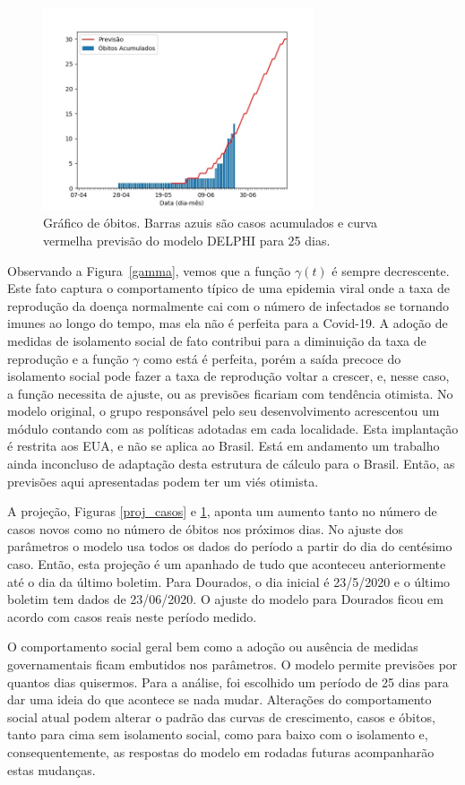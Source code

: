 \documentclass[12pt]{article}
\begin{document}
\begin{figure}[t]
 \centering
 \includegraphics[width=8cm]{figs/Fig_Brasil_MS_Dourados_obitos_20200624_025dias.jpg}
 \caption{Gráfico de óbitos. Barras azuis são casos acumulados e curva vermelha previsão do modelo DELPHI para 25 dias.}
 \label{proj_obitos}
\end{figure}

Observando a Figura~\ref{gamma}, vemos que a função $\gamma(t)$ é sempre decrescente. Este fato captura o comportamento típico de uma epidemia viral onde a taxa de reprodução da doença normalmente cai com o número de infectados se tornando imunes ao longo do tempo, mas ela não é perfeita para a Covid-19. A adoção de medidas de isolamento social de fato contribui para a diminuição da taxa de reprodução e a função $\gamma$ como está é perfeita, porém a saída precoce do isolamento social pode fazer a taxa de reprodução voltar a crescer, e, nesse caso, a função necessita de ajuste, ou as previsões ficariam com tendência otimista. No modelo original, o grupo responsável pelo seu desenvolvimento acrescentou um módulo contando com as políticas adotadas em cada localidade. Esta implantação é restrita aos EUA, e não se aplica ao Brasil. Está em andamento um trabalho ainda inconcluso de adaptação desta estrutura de cálculo para o Brasil. Então, as previsões aqui apresentadas podem ter um viés otimista. 

A projeção, Figuras \ref{proj_casos} e \ref{proj_obitos}, aponta um aumento tanto no número de casos novos como no número de óbitos nos próximos dias. No ajuste dos parâmetros o modelo usa todos os dados do período a partir do dia do centésimo caso. Então, esta projeção é um apanhado de tudo que aconteceu anteriormente até o dia da último boletim. Para Dourados, o dia inicial é 23/5/2020 e o último boletim tem dados de 23/06/2020. O ajuste do modelo para Dourados ficou em acordo com casos reais neste período medido.

O comportamento social geral bem como a adoção ou ausência de medidas governamentais ficam embutidos nos parâmetros. O modelo permite previsões por quantos dias quisermos. Para a análise, foi escolhido um período de 25 dias para dar uma ideia do que acontece se nada mudar. Alterações do comportamento social atual podem alterar o padrão das curvas de crescimento, casos e óbitos, tanto para cima sem isolamento social, como para baixo com o isolamento  e, consequentemente, as respostas do modelo em rodadas futuras acompanharão estas mudanças.
\end{document}
